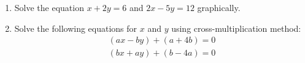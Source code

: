 \begin{enumerate}
\item Solve the equation $x+2y=6$ and $2x-5y=12$ graphically.
\item Solve the following equations for $x$ and $y$ using cross-multiplication method:
	\begin{align}
		(ax-by)+(a+4b)=0 \\
                (bx+ay)+(b-4a)=0
	\end{align}
\end{enumerate}
